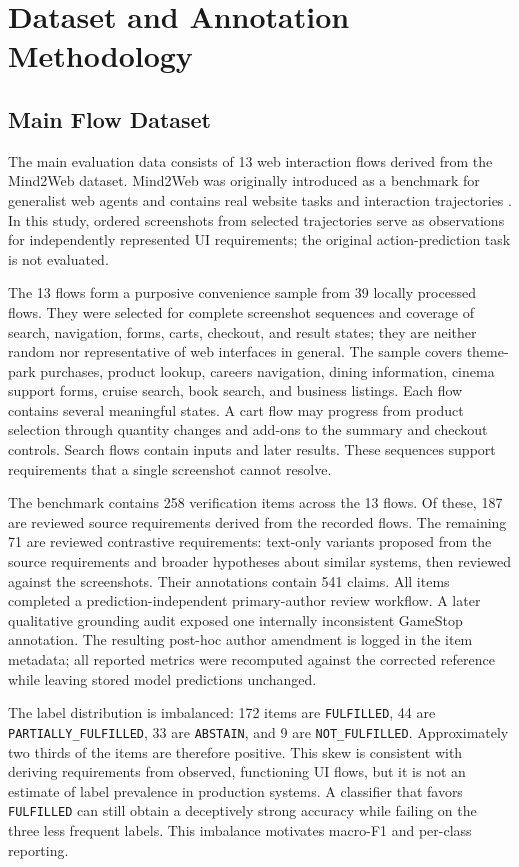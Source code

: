 \chapter{Dataset and Annotation Methodology}\label{dataset-and-annotation-methodology}

\section{Main Flow Dataset}\label{main-flow-dataset}

The main evaluation data consists of 13 web interaction flows derived from the Mind2Web dataset. Mind2Web was originally introduced as a benchmark for generalist web agents and contains real website tasks and interaction trajectories \autocite{deng2023}. In this study, ordered screenshots from selected trajectories serve as observations for independently represented UI requirements; the original action-prediction task is not evaluated.

The 13 flows form a purposive convenience sample from 39 locally processed
flows. They were selected for complete screenshot sequences and coverage of
search, navigation, forms, carts, checkout, and result states; they are neither
random nor representative of web interfaces in general. The sample covers
theme-park purchases, product lookup, careers navigation, dining information,
cinema support forms, cruise search, book search, and business listings. Each
flow contains several meaningful states. A
cart flow may progress from product selection through quantity changes and
add-ons to the summary and checkout controls. Search flows contain inputs and
later results. These sequences support requirements that a single screenshot
cannot resolve.

The benchmark contains 258 verification items across the 13 flows. Of these,
187 are reviewed source requirements derived from the recorded flows. The
remaining 71 are reviewed contrastive requirements: text-only variants proposed
from the source requirements and broader hypotheses about similar systems, then
reviewed against the screenshots. Their annotations contain 541 claims. All
items completed a prediction-independent primary-author review workflow. A
later qualitative grounding audit exposed one internally inconsistent GameStop
annotation. The resulting post-hoc author amendment is logged in the item
metadata; all reported metrics were recomputed against the corrected reference
while leaving stored model predictions unchanged.

The label distribution is imbalanced: 172 items are \texttt{FULFILLED}, 44 are \texttt{PARTIALLY\_\allowbreak FULFILLED}, 33 are \texttt{ABSTAIN}, and 9 are \texttt{NOT\_FULFILLED}. Approximately two thirds of the items are therefore positive. This skew is consistent with deriving requirements from observed, functioning UI flows, but it is not an estimate of label prevalence in production systems. A classifier that favors \texttt{FULFILLED} can still obtain a deceptively strong accuracy while failing on the three less frequent labels. This imbalance motivates macro-F1 and per-class reporting.

